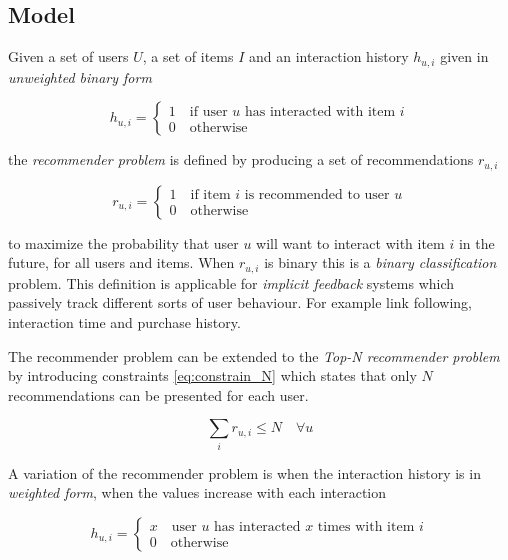 
\subsection{Model}\label{sec:background:theory:model}

Given a set of users $U$, a set of items $I$ and an interaction history $h_{u, i}$ given in \textit{unweighted binary form}

\begin{equation}\label{eq:hist}
    h_{u, i} = \begin{cases}
        1 \quad \text{if user $u$ has interacted with item $i$} \\
        0 \quad \text{otherwise}
    \end{cases}
\end{equation}

the \textit{recommender problem} is defined by producing a set of recommendations $r_{u, i}$

\begin{equation}\label{eq:binrec}
    r_{u, i} = \begin{cases}
        1 \quad \text{if item $i$ is recommended to user $u$} \\
        0 \quad \text{otherwise}
    \end{cases}
\end{equation}

to maximize the probability that user $u$ will want to interact with item $i$ in the future, for all users and items.  When $r_{u, i}$ is binary this is a \textit{binary classification} problem. This definition is applicable for \textit{implicit feedback} systems which passively track different sorts of user behaviour. For example link following, interaction time and purchase history.

The recommender problem can be extended to the \textit{Top-N recommender problem} by introducing constraints \eqref{eq:constrain_N} which states that only $N$ recommendations can be presented for each user.

\begin{equation}\label{eq:constrain_N}
    \sum_i r_{u, i} \leq N \quad \forall u
\end{equation}


A variation of the recommender problem is when the interaction history is in \textit{weighted form}, when the values increase with each interaction

\begin{equation}\label{eq:whist}
    h_{u, i} = \begin{cases}
        x \quad \text{user $u$ has interacted $x$ times with item $i$} \\
        0 \quad \text{otherwise}
    \end{cases}
\end{equation}

